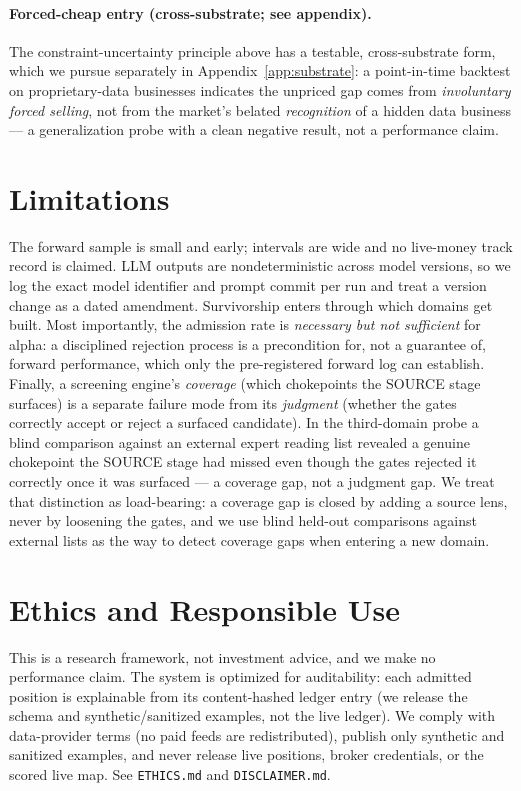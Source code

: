\documentclass[11pt]{article}
\begin{document}
\paragraph{Forced-cheap entry (cross-substrate; see appendix).} The constraint-uncertainty principle
above has a testable, cross-substrate form, which we pursue separately in Appendix~\ref{app:substrate}:
a point-in-time backtest on proprietary-data businesses indicates the unpriced gap comes from
\emph{involuntary forced selling}, not from the market's belated \emph{recognition} of a hidden data
business --- a generalization probe with a clean negative result, not a performance claim.

\section{Limitations}
The forward sample is small and early; intervals are wide and no live-money track record is claimed.
LLM outputs are nondeterministic across model versions, so we log the exact model identifier and
prompt commit per run and treat a version change as a dated amendment. Survivorship enters through
which domains get built. Most importantly, the admission rate is \emph{necessary but not sufficient}
for alpha: a disciplined rejection process is a precondition for, not a guarantee of, forward
performance, which only the pre-registered forward log can establish. Finally, a screening engine's
\emph{coverage} (which chokepoints the SOURCE stage surfaces) is a separate failure mode from its
\emph{judgment} (whether the gates correctly accept or reject a surfaced candidate). In the
third-domain probe a blind comparison against an external expert reading list revealed a genuine
chokepoint the SOURCE stage had missed even though the gates rejected it correctly once it was
surfaced --- a coverage gap, not a judgment gap. We treat that distinction as load-bearing: a coverage
gap is closed by adding a source lens, never by loosening the gates, and we use blind held-out
comparisons against external lists as the way to detect coverage gaps when entering a new domain.

\section{Ethics and Responsible Use}
This is a research framework, not investment advice, and we make no performance claim. The system is
optimized for auditability: each admitted position is explainable from its content-hashed ledger
entry (we release the schema and synthetic/sanitized examples, not the live ledger). We comply with data-provider terms (no paid feeds are redistributed), publish only synthetic
and sanitized examples, and never release live positions, broker credentials, or the scored live map.
See \texttt{ETHICS.md} and \texttt{DISCLAIMER.md}.
\end{document}
